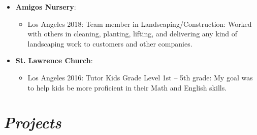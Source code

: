 \documentclass[11pt]{article}
\begin{document}
\begin{itemize}

\item   {\textbf{Amigos Nursery}}: 

\begin{itemize}
\item  Los Angeles 2018: Team member in Landscaping/Construction: Worked with others in cleaning, planting, lifting, and delivering any kind of landscaping work to customers and other companies. 
 \end{itemize} 

 
\item  {\textbf{St. Lawrence Church}}: 

\begin{itemize}
\item Los Angeles 2016: Tutor Kids Grade Level 1st – 5th grade: My goal was to help kids be more proficient in their Math and English skills. 
 \end{itemize} 

 \end{itemize} 

\section{\textit {Projects}}
\end{document}
